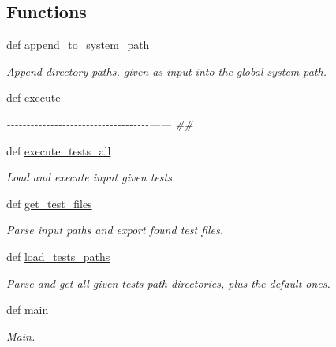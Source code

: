 \subsection*{Functions}
\begin{DoxyCompactItemize}
\item 
def \hyperlink{namespacerapp__testing__tools_1_1rapp__testing__core_a7398ed9a9853b041ea219841b1ad1752}{append\-\_\-to\-\_\-system\-\_\-path}
\begin{DoxyCompactList}\small\item\em Append directory paths, given as input into the global system path. \end{DoxyCompactList}\item 
def \hyperlink{namespacerapp__testing__tools_1_1rapp__testing__core_af64b7daeabbce6f4f6b4350bb83c27e7}{execute}
\begin{DoxyCompactList}\small\item\em -\/-\/-\/-\/-\/-\/-\/-\/-\/-\/-\/-\/-\/-\/-\/-\/-\/-\/-\/-\/-\/-\/-\/-\/-\/-\/-\/-\/-\/-\/-\/-\/-\/-\/-\/-\/------ \#\# \end{DoxyCompactList}\item 
def \hyperlink{namespacerapp__testing__tools_1_1rapp__testing__core_aeb950d56b7a32adbe4a56b50fa2bdff6}{execute\-\_\-tests\-\_\-all}
\begin{DoxyCompactList}\small\item\em Load and execute input given tests. \end{DoxyCompactList}\item 
def \hyperlink{namespacerapp__testing__tools_1_1rapp__testing__core_a0e5ad01c811acd643730c8dc4868418a}{get\-\_\-test\-\_\-files}
\begin{DoxyCompactList}\small\item\em Parse input paths and export found test files. \end{DoxyCompactList}\item 
def \hyperlink{namespacerapp__testing__tools_1_1rapp__testing__core_a15a42599e55cb448a70f3a3019b4a82d}{load\-\_\-tests\-\_\-paths}
\begin{DoxyCompactList}\small\item\em Parse and get all given tests path directories, plus the default ones. \end{DoxyCompactList}\item 
def \hyperlink{namespacerapp__testing__tools_1_1rapp__testing__core_a5bbf286af74abf2591f8aadd812571b6}{main}
\begin{DoxyCompactList}\small\item\em Main. \end{DoxyCompactList}\item 

\end{DoxyCompactItemize}
